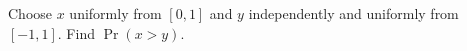 Choose $x$ uniformly from $[0,1]$ and $y$ independently and uniformly from $[-1,1]$. Find $\Pr(x>y)$.
